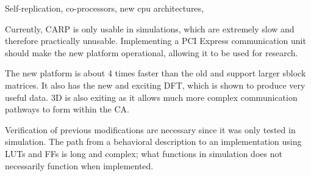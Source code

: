 Self-replication, co-processors, new cpu architectures, 

Currently, CARP is only usable in simulations, which are extremely slow and therefore practically unusable.
Implementing a PCI Express communication unit should make the new platform operational, allowing it to be used for research.

The new platform is about 4 times faster than the old and support larger sblock matrices.
It also has the new and exciting DFT, which is shown to produce very useful data.
3D is also exiting as it allows much more complex communication pathways to form within the CA.

Verification of previous modifications are necessary since it was only tested in simulation.
The path from a behavioral description to an implementation using LUTs and FFs is long and complex; what functions in simulation does not necessarily function when implemented.


